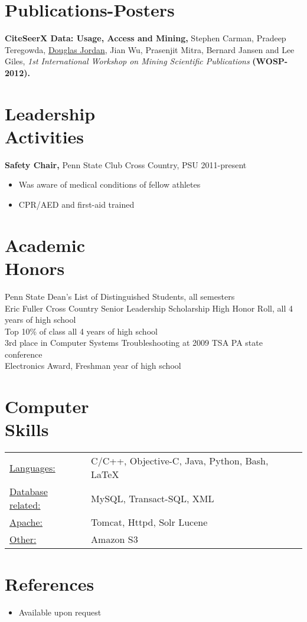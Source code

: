 \documentclass[margin]{res}
\begin{document}
\begin{resume}
\section{Publications-Posters}
{\bf CiteSeerX Data: Usage, Access and Mining,} Stephen Carman, Pradeep Teregowda, \underline{Douglas Jordan}, Jian Wu, Prasenjit Mitra, Bernard Jansen and Lee Giles, \emph{1st International Workshop on Mining Scientific Publications} {\bf (WOSP-2012).}

\section{Leadership \\ Activities}
{\bf Safety Chair,} Penn State Club Cross Country, PSU \hfill 2011-present
\begin{itemize} \itemsep -2pt
\item Was aware of medical conditions of fellow athletes
\item CPR/AED and first-aid trained
\end{itemize}

\section{Academic \\ Honors} 
Penn State Dean's List of Distinguished Students, all semesters \\
Eric Fuller Cross Country Senior Leadership Scholarship
High Honor Roll, all 4 years of high school \\
Top 10\% of class all 4 years of high school \\
3rd place in Computer Systems Troubleshooting at 2009 TSA PA state conference \\
Electronics Award, Freshman year of high school \\

\section{Computer \\ Skills}
\begin{tabular}{l p{3in}}
\underline{Languages:} & C/C++, Objective-C, Java, Python, Bash, LaTeX \\
\underline{Database related:} & MySQL, Transact-SQL, XML \\
\underline{Apache:} & Tomcat, Httpd, Solr Lucene \\
\underline{Other:} & Amazon S3
\end{tabular}

\section{References}
\begin{itemize} \itemsep -2pt
\item Available upon request
\end{itemize}
\end{resume}
\end{document}
